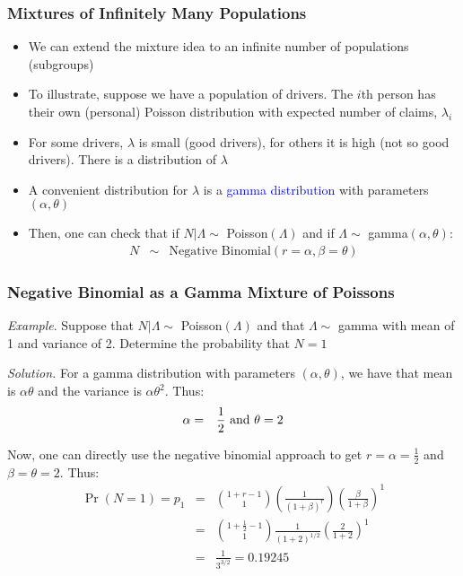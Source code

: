 \documentclass{beamer}
\begin{document}
\begin{frame}[shrink=2]%
\frametitle{Mixtures of Infinitely Many Populations}
\begin{itemize}
\item We can extend the mixture idea to an infinite number of
populations (subgroups) \vspace{2mm}
\item To illustrate, suppose we have a population of drivers. The $i$th person has their own (personal) Poisson distribution with expected number of claims,
$\lambda_i$ \vspace{2mm}
\item For some drivers, $\lambda$ is small (good drivers), for others it is high (not so good drivers). There is a distribution of
$\lambda$ \vspace{2mm}
\item A convenient distribution for $\lambda$ is a \textcolor{blue}{gamma distribution} with parameters $(\alpha,
\theta)$ \vspace{2mm}
 \item Then, one can check that if $N|\Lambda \sim$ Poisson$(\Lambda)$
and if $\Lambda \sim$ gamma$(\alpha, \theta)$:
\begin{eqnarray*}
N &\sim& \text{Negative Binomial} (r = \alpha, \beta = \theta)
\end{eqnarray*}
 \end{itemize}
\end{frame}


\begin{frame}%
\frametitle{Negative Binomial as a Gamma Mixture of Poissons}
\textit{Example}. Suppose that $N|\Lambda \sim$ Poisson$(\Lambda)$
and that $\Lambda \sim$ gamma with mean of 1 and variance of 2.
Determine the probability that $N=1$ \vspace{2mm}

\textit{Solution.} For a gamma distribution with parameters
$(\alpha, \theta)$, we have that mean  is $ \alpha \theta$ and the
variance is $\alpha \theta^2$. Thus:
\begin{eqnarray*}
\alpha &=& \frac{1}{2} \text{   and   } \theta =2 \vspace{2mm}
\end{eqnarray*}

Now, one can directly use the negative binomial approach to get $r =
\alpha = \frac{1}{2}$ and $\beta= \theta =2 $. Thus:
\begin{eqnarray*}
\Pr(N=1) = p_1  &=& {1+r-1 \choose 1}(\frac{1}{(1+\beta)^r})(\frac{\beta}{1+\beta})^1 \\
&=&                 {1+\frac{1}{2}-1 \choose 1}{\frac{1}{(1+2)^{1/2}}}(\frac{2}{1+2})^1\\
&=&  \frac{1}{3^{3/2}} = 0.19245
\end{eqnarray*}

\end{frame}
\end{document}
